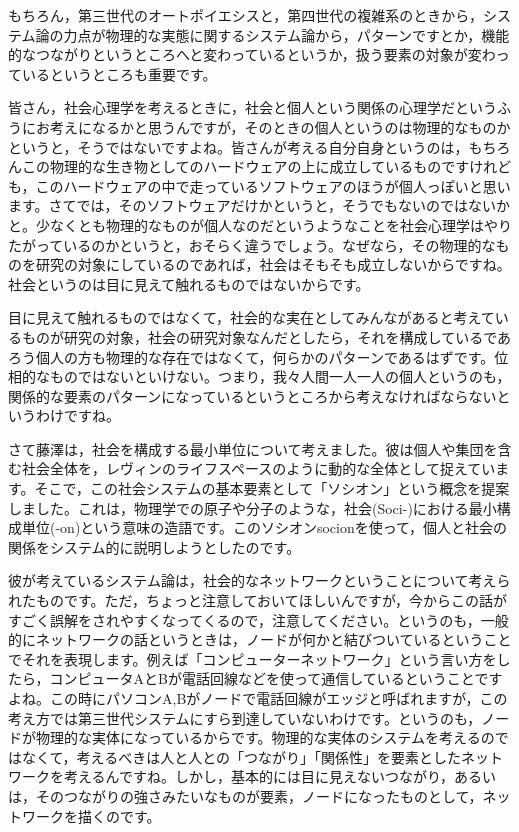 \documentclass{ltjsbook}
\begin{document}
もちろん，第三世代のオートポイエシスと，第四世代の複雑系のときから，システム論の力点が物理的な実態に関するシステム論から，パターンですとか，機能的なつながりというところへと変わっているというか，扱う要素の対象が変わっているというところも重要です。


皆さん，社会心理学を考えるときに，社会と個人という関係の心理学だというふうにお考えになるかと思うんですが，そのときの個人というのは物理的なものかというと，そうではないですよね。皆さんが考える自分自身というのは，もちろんこの物理的な生き物としてのハードウェアの上に成立しているものですけれども，このハードウェアの中で走っているソフトウェアのほうが個人っぽいと思います。さてでは，そのソフトウェアだけかというと，そうでもないのではないかと。少なくとも物理的なものが個人なのだというようなことを社会心理学はやりたがっているのかというと，おそらく違うでしょう。なぜなら，その物理的なものを研究の対象にしているのであれば，社会はそもそも成立しないからですね。社会というのは目に見えて触れるものではないからです。

目に見えて触れるものではなくて，社会的な実在としてみんながあると考えているものが研究の対象，社会の研究対象なんだとしたら，それを構成しているであろう個人の方も物理的な存在ではなくて，何らかのパターンであるはずです。位相的なものではないといけない。つまり，我々人間一人一人の個人というのも，関係的な要素のパターンになっているというところから考えなければならないというわけですね。

さて藤澤は，社会を構成する最小単位について考えました。彼は個人や集団を含む社会全体を，レヴィンのライフスペースのように動的な全体として捉えています。そこで，この社会システムの基本要素として「ソシオン」という概念を提案しました。これは，物理学での原子や分子のような，社会(Soci-)における最小構成単位(-on)という意味の造語です。このソシオンsocionを使って，個人と社会の関係をシステム的に説明しようとしたのです。

彼が考えているシステム論は，社会的なネットワークということについて考えられたものです。ただ，ちょっと注意しておいてほしいんですが，今からこの話がすごく誤解をされやすくなってくるので，注意してください。というのも，一般的にネットワークの話というときは，ノードが何かと結びついているということでそれを表現します。例えば「コンピューターネットワーク」という言い方をしたら，コンピュータAとBが電話回線などを使って通信しているということですよね。この時にパソコンA,Bがノードで電話回線がエッジと呼ばれますが，この考え方では第三世代システムにすら到達していないわけです。というのも，ノードが物理的な実体になっているからです。物理的な実体のシステムを考えるのではなくて，考えるべきは人と人との「つながり」「関係性」を要素としたネットワークを考えるんですね。しかし，基本的には目に見えないつながり，あるいは，そのつながりの強さみたいなものが要素，ノードになったものとして，ネットワークを描くのです。
\end{document}
